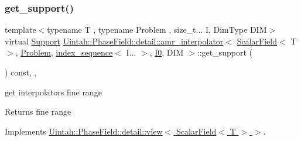 \subsubsection{\texorpdfstring{get\+\_\+support()}{get\_support()}}
{\footnotesize\ttfamily template$<$typename T , typename Problem , size\+\_\+t... I, Dim\+Type D\+IM$>$ \\
virtual \hyperlink{classUintah_1_1PhaseField_1_1Support}{Support} \hyperlink{classUintah_1_1PhaseField_1_1detail_1_1amr__interpolator}{Uintah\+::\+Phase\+Field\+::detail\+::amr\+\_\+interpolator}$<$ \hyperlink{structUintah_1_1PhaseField_1_1ScalarField}{Scalar\+Field}$<$ T $>$, \hyperlink{classUintah_1_1PhaseField_1_1Problem}{Problem}, \hyperlink{namespaceUintah_1_1PhaseField_a237de804d99512e50613aff7c94a9461}{index\+\_\+sequence}$<$ I... $>$, \hyperlink{namespaceUintah_1_1PhaseField_a547ce3002aa97fbd3ef3192a6eec8406abdd8ebcbdfd71d1125937e3012dc45fb}{I0}, D\+IM $>$\+::get\+\_\+support (\begin{DoxyParamCaption}{ }\end{DoxyParamCaption}) const\hspace{0.3cm}{\ttfamily [inline]}, {\ttfamily [override]}, {\ttfamily [virtual]}}



get interpolator\textquotesingle{}s fine range 

\begin{DoxyReturn}{Returns}
fine range 
\end{DoxyReturn}


Implements \hyperlink{classUintah_1_1PhaseField_1_1detail_1_1view_3_01ScalarField_3_01T_01_4_01_4_a3e14b0c7a57a57707bb33954861ab1c1}{Uintah\+::\+Phase\+Field\+::detail\+::view$<$ Scalar\+Field$<$ T $>$ $>$}.

\mbox{\label{classUintah_1_1PhaseField_1_1detail_1_1amr__interpolator_3_01ScalarField_3_01T_01_4_00_01Problem64f2458f98b03e27672a091eecc4b696_a717ca596094560642261d7bec44c6695}} 
